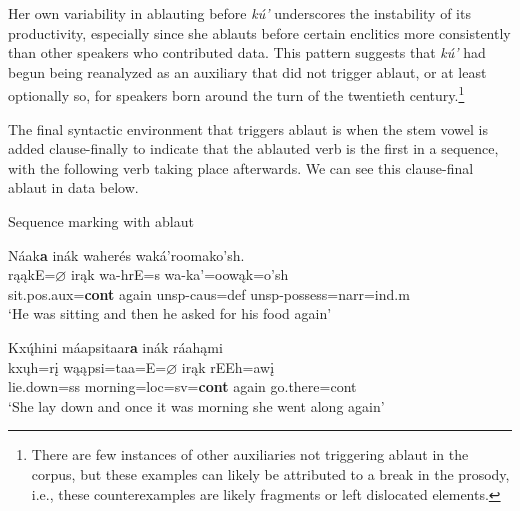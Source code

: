  Her own variability in ablauting before \textit{kú'} underscores the instability of its productivity, especially since she ablauts before certain enclitics more consistently than other speakers who contributed data. This pattern suggests that \textit{kú'} had begun being reanalyzed as an auxiliary that did not trigger ablaut, or at least optionally so, for speakers born around the turn of the twentieth century.\footnote{There are few instances of other auxiliaries not triggering ablaut in the corpus, but these examples can likely be attributed to a break in the prosody, i.e., these counterexamples are likely fragments or left dislocated elements.}

The final syntactic environment that triggers ablaut is when the stem vowel is added clause-finally to indicate that the ablauted verb is the first in a sequence, with the following verb taking place afterwards. We can see this clause-final ablaut in data below.

\begin{exe}

\item\label{CPfinalablaut} Sequence marking with ablaut

	\begin{xlist}

	\item\label{CPfinalablaut1} \glll Náak\textbf{a} inák waherés waká'roomako'sh.\\
	rąąkE=\textbf{$\varnothing$} irąk wa-hrE=s wa-ka'=oowąk=o'sh\\
	\textnormal{sit}.pos.aux=\textbf{cont} \textnormal{again} unsp-caus=def unsp-\textnormal{possess}=narr=ind.m\\
	\glt `He was sitting and then he asked for his food again' \citep[94]{hollow1973b}

	\item\label{CPfinablaut2}
	\glll Kxų́hini máapsitaar\textbf{a} inák ráahąmi\\
	kxųh=rį wąąpsi=taa=E=\textbf{$\varnothing$} irąk rEEh=awį\\
	\textnormal{lie.down}=ss \textnormal{morning}=loc=sv=\textbf{cont} \textnormal{again} \textnormal{go.there}=cont\\
	\glt `She lay down and once it was morning she went along again' \citep[103]{hollow1973a}

	\end{xlist}

\end{exe}

